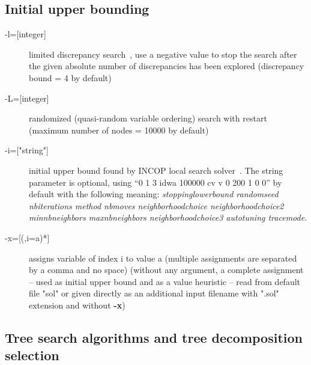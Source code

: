 \documentclass{article}
\begin{document}
\subsection{Initial upper bounding}

\begin{description}
\item[{-l=[integer]}] limited discrepancy search~\cite{Ginsberg95}, use a negative value to stop the search after the given absolute number of discrepancies has been explored (discrepancy bound = 4 by default)
\item[{-L=[integer]}] randomized (quasi-random variable ordering) search with restart (maximum number of nodes = 10000 by default)
\item[{-i=["string"]}] initial upper bound found by INCOP local search
  solver~\cite{idwalk:cp04}. The string parameter is optional, using ``0 1 3 idwa 100000
  cv v 0 200 1 0 0'' by default with the following meaning:
  {\em stoppinglowerbound randomseed nbiterations method nbmoves
  neighborhoodchoice neighborhoodchoice2 minnbneighbors maxnbneighbors
  neighborhoodchoice3 autotuning tracemode}.
\item[{-x=[(,i=a)*]}] assigns variable of index i to value a (multiple
  assignments are separated by a comma and no space) (without any
  argument, a complete assignment -- used as initial upper bound and
  as a value heuristic -- read from default file "sol" or given directly as an additional input
  filename with ".sol" extension and without {\bf -x})
\end{description}

\subsection{Tree search algorithms and tree decomposition selection}
\end{document}
